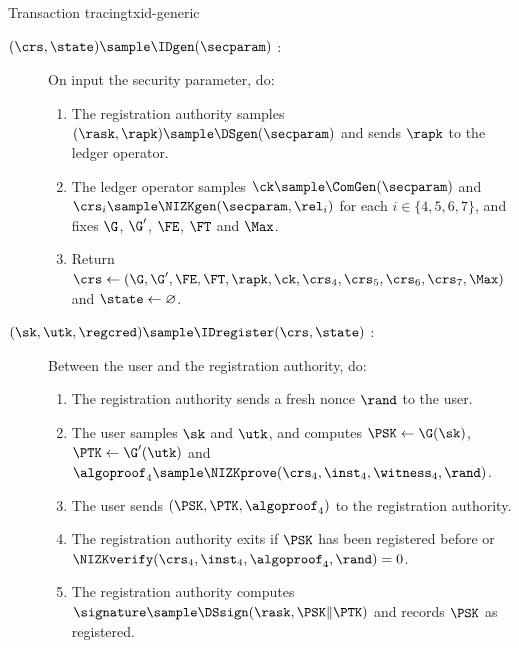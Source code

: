 \begin{protocolbox}{Transaction tracing}{txid-generic}

  \begin{description}

    \item[$(\crs,\state) \sample \IDgen(\secparam)$ :] On input the security
parameter, do:

      \begin{enumerate}

	\item The registration authority samples $(\rask,\rapk) \sample
\DSgen(\secparam)$ and sends $\rapk$ to the ledger operator.

	\item The ledger operator samples $\ck \sample \ComGen(\secparam)$ and
$\crs_i \sample \NIZKgen(\secparam,\rel_i)$ for each $i \in \{4,5,6,7\}$, and
fixes $\G$, $\G'$, $\FE$, $\FT$ and $\Max$.

	\item Return $\crs \leftarrow
(\G,\G',\FE,\FT,\rapk,\ck,\crs_4,\crs_5,\crs_6,\crs_7,\Max)$ and $\state
\leftarrow \varnothing$.

      \end{enumerate}

    \item[$(\sk,\utk,\regcred) \sample \IDregister(\crs,\state)$ :] Between the
user and the registration authority, do:

      \begin{enumerate}

	\item The registration authority sends a fresh nonce $\rand$ to the
user.

	\item The user samples $\sk$ and $\utk$, and computes $\PSK \leftarrow
\G(\sk)$, $\PTK \leftarrow \G'(\utk)$ and $\algoproof_4 \sample
\NIZKprove(\crs_4,\inst_4,\witness_4,\rand)$.

	\item The user sends $(\PSK,\PTK,\algoproof_4)$ to the registration
authority.

	\item The registration authority exits if $\PSK$ has been registered
before or $\NIZKverify(\crs_4,\inst_4,\algoproof_4,\rand) = 0$.

	\item The registration authority computes $\signature \sample
\DSsign(\rask,\PSK\|\PTK)$ and records $\PSK$ as registered.


\end{enumerate}
\end{description}
\end{protocolbox}
